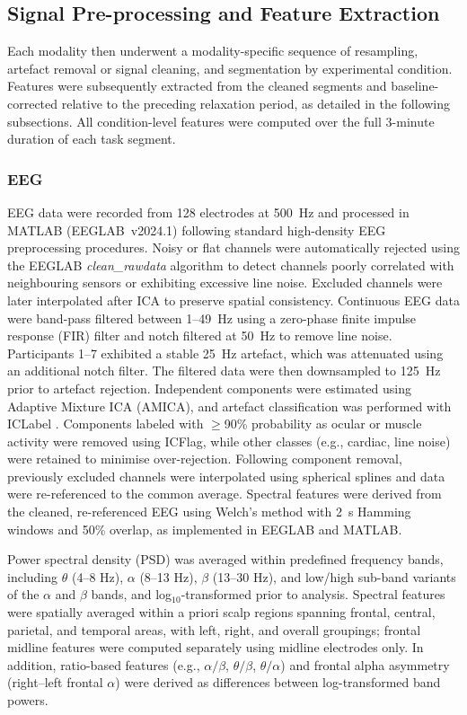 \documentclass[lettersize,journal]{IEEEtran}
\begin{document}
\subsection{Signal Pre-processing and Feature Extraction}
Each modality then underwent a modality-specific sequence of resampling, artefact removal or signal cleaning, and segmentation by experimental condition. Features were subsequently extracted from the cleaned segments and baseline-corrected relative to the preceding relaxation period, as detailed in the following subsections.
All condition-level features were computed over the full 3-minute duration of each task segment.

\subsubsection{EEG}
EEG data were recorded from 128 electrodes at 500~Hz and processed in MATLAB (EEGLAB~v2024.1) following standard high-density EEG preprocessing procedures. Noisy or flat channels were automatically rejected using the EEGLAB \textit{clean\_rawdata} algorithm to detect channels poorly correlated with neighbouring sensors or exhibiting excessive line noise. Excluded channels were later interpolated after ICA to preserve spatial consistency. Continuous EEG data were band-pass filtered between 1--49~Hz using a zero-phase finite impulse response (FIR) filter and notch filtered at 50~Hz to remove line noise. Participants 1--7 exhibited a stable 25~Hz artefact, which was attenuated using an additional notch filter. The filtered data were then downsampled to 125~Hz prior to artefact rejection. Independent components were estimated using Adaptive Mixture ICA (AMICA), and artefact classification was performed with ICLabel \cite{pion-tonachiniICLabelAutomatedElectroencephalographic2019}. Components labeled with $\geq$90\% probability as ocular or muscle activity were removed using ICFlag, while other classes (e.g., cardiac, line noise) were retained to minimise over-rejection. Following component removal, previously excluded channels were interpolated using spherical splines and data were re-referenced to the common average. Spectral features were derived from the cleaned, re-referenced EEG using Welch’s method with 2~s Hamming windows and 50\% overlap, as implemented in EEGLAB and MATLAB.

Power spectral density (PSD) was averaged within predefined frequency bands, including $\theta$ (4–8 Hz), $\alpha$ (8–13 Hz), $\beta$ (13–30 Hz), and low/high sub-band variants of the $\alpha$ and $\beta$ bands, and log$_{10}$-transformed prior to analysis. Spectral features were spatially averaged within a priori scalp regions spanning frontal, central, parietal, and temporal areas, with left, right, and overall groupings; frontal midline features were computed separately using midline electrodes only. In addition, ratio-based features (e.g., $\alpha/\beta$, $\theta/\beta$, $\theta/\alpha$) and frontal alpha asymmetry (right–left frontal $\alpha$) were derived as differences between log-transformed band powers.
\end{document}
